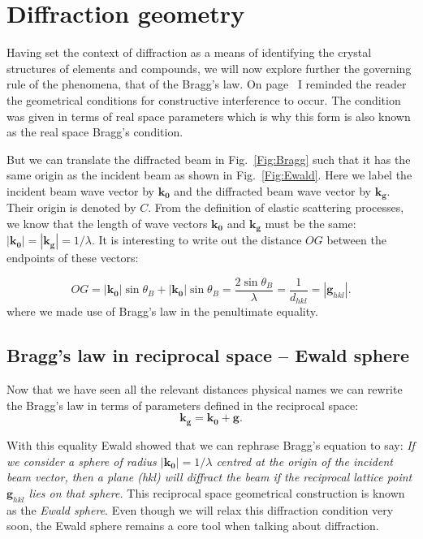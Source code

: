 \section{Diffraction geometry}
\label{sec:geometry}
Having set the context of diffraction as a means of identifying the crystal structures of elements and compounds, we will now explore further the governing rule of the phenomena, that of the Bragg's law. On page~\pageref{Sec:Bragg} I reminded the reader the geometrical conditions for constructive interference to occur. The condition was given in terms of real space parameters which is why this form is also known as the real space Bragg's condition.

But we can translate the diffracted beam in  Fig.~\ref{Fig:Bragg} such that it has the same origin as the incident beam as shown in Fig.~\ref{Fig:Ewald}. Here we label the incident beam wave vector by $\mathbf{k_0}$ and the diffracted beam wave vector by $\mathbf{k_g}$. Their origin is denoted by $C$. From the definition of elastic scattering processes, we know that the length of wave vectors $\mathbf{k_0}$ and $\mathbf{k_g}$ must be the same: $|\mathbf{k_0}|=|\mathbf{k_g}| = 1/\lambda$. It is interesting to write out the distance $OG$ between the endpoints of these vectors:

\begin{equation*}
OG = |\mathbf{k_0}|\sin{\theta_B} + |\mathbf{k_0}|\sin{\theta_B} =\frac{2\sin{\theta_B}}{\lambda}=\frac{1}{d_{hkl}}=|\mathbf{g}_{hkl}|.
\end{equation*}
where we made use of Bragg's law in the penultimate equality.




\subsection{Bragg's law in reciprocal space -- Ewald sphere}
\label{sec:Ewald}
Now that we have seen all the relevant distances physical names we can rewrite the Bragg's law in terms of parameters defined in the reciprocal space:
\begin{equation}
\label{eq:Bragg1}
    \mathbf{k_g}=\mathbf{k_0}+\mathbf{g}.
\end{equation}

With this equality Ewald showed that we can rephrase Bragg's equation to say: \textit{If we consider a sphere of radius $|\mathbf{k_0}|=1/\lambda$ centred at the origin of the incident beam vector, then a plane \hkl(hkl) will diffract the beam if the reciprocal lattice point $\mathbf{g}_{hkl}$ lies on that sphere.} This reciprocal space geometrical construction is known as the \textit{Ewald sphere}.  Even though we will relax this diffraction condition very soon, the Ewald sphere remains a core tool when talking about diffraction. 

